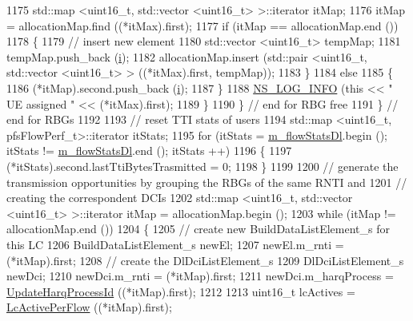 \begin{DoxyCode}
1175               std::map <uint16\_t, std::vector <uint16\_t> >::iterator itMap;
1176               itMap = allocationMap.find ((*itMax).first);
1177               \textcolor{keywordflow}{if} (itMap == allocationMap.end ())
1178                 \{
1179                   \textcolor{comment}{// insert new element}
1180                   std::vector <uint16\_t> tempMap;
1181                   tempMap.push\_back (\hyperlink{bernuolliDistribution_8m_a6f6ccfcf58b31cb6412107d9d5281426}{i});
1182                   allocationMap.insert (std::pair <uint16\_t, std::vector <uint16\_t> > ((*itMax).first, 
      tempMap));
1183                 \}
1184               \textcolor{keywordflow}{else}
1185                 \{
1186                   (*itMap).second.push\_back (\hyperlink{bernuolliDistribution_8m_a6f6ccfcf58b31cb6412107d9d5281426}{i});
1187                 \}
1188               \hyperlink{group__logging_gafbd73ee2cf9f26b319f49086d8e860fb}{NS\_LOG\_INFO} (\textcolor{keyword}{this} << \textcolor{stringliteral}{" UE assigned "} << (*itMax).first);
1189             \}
1190         \} \textcolor{comment}{// end for RBG free}
1191     \} \textcolor{comment}{// end for RBGs}
1192 
1193   \textcolor{comment}{// reset TTI stats of users}
1194   std::map <uint16\_t, pfsFlowPerf\_t>::iterator itStats;
1195   \textcolor{keywordflow}{for} (itStats = \hyperlink{classns3_1_1PfFfMacScheduler_a00b148349167b85ab9170570e2530b92}{m\_flowStatsDl}.begin (); itStats != \hyperlink{classns3_1_1PfFfMacScheduler_a00b148349167b85ab9170570e2530b92}{m\_flowStatsDl}.end (); itStats
      ++)
1196     \{
1197       (*itStats).second.lastTtiBytesTrasmitted = 0;
1198     \}
1199 
1200   \textcolor{comment}{// generate the transmission opportunities by grouping the RBGs of the same RNTI and}
1201   \textcolor{comment}{// creating the correspondent DCIs}
1202   std::map <uint16\_t, std::vector <uint16\_t> >::iterator itMap = allocationMap.begin ();
1203   \textcolor{keywordflow}{while} (itMap != allocationMap.end ())
1204     \{
1205       \textcolor{comment}{// create new BuildDataListElement\_s for this LC}
1206       BuildDataListElement\_s newEl;
1207       newEl.m\_rnti = (*itMap).first;
1208       \textcolor{comment}{// create the DlDciListElement\_s}
1209       DlDciListElement\_s newDci;
1210       newDci.m\_rnti = (*itMap).first;
1211       newDci.m\_harqProcess = \hyperlink{classns3_1_1PfFfMacScheduler_ac9ae283895ee58f636597117be34f959}{UpdateHarqProcessId} ((*itMap).first);
1212 
1213       uint16\_t lcActives = \hyperlink{classns3_1_1PfFfMacScheduler_a97f6912a6bb4987ab0a718852b6f8d29}{LcActivePerFlow} ((*itMap).first);

\end{DoxyCode}
